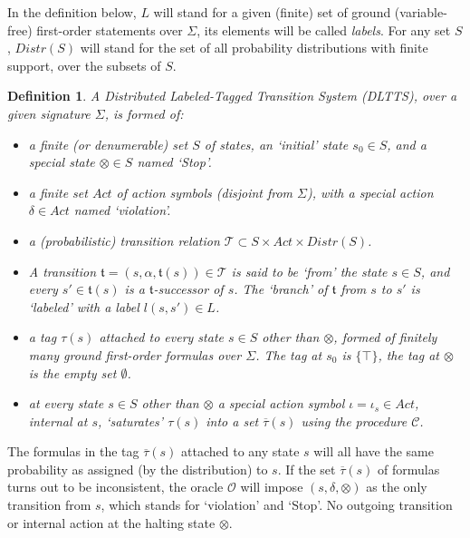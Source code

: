 \documentclass[pdflatex]{article}
\def \C {{\mathcal{C}}}
\def \o {{\mathcal{O}}}
\def \T {{\mathcal{T}}}
\def \t {{\mathfrak t}}
\newtheorem{defn}{Definition}
\def \otau {\overline{\tau}}
\begin{document}
In the definition below, $L$ will stand for a given (finite) set of ground (variable-free) 
first-order statements over $\Sigma$, its elements will be called {\em  labels}.
For any set $S$, $Distr(S)$ will stand for the set of all probability  distributions 
with finite support,  over the subsets of $S$. 

\begin{defn}
  A Distributed Labeled-Tagged Transition System (DLTTS), over a given
  signature $\Sigma$, is formed of:
  \begin{itemize}
 \item[-] a  finite (or denumerable) set $S$ of  states, an `initial'  state  $s_0 \in S$,
 and a special  state $\otimes \in S$ named `Stop'. 

\item[-] a finite set $Act$ of action symbols (disjoint from $\Sigma$), with  a
  special action $\delta \in Act$ named `violation'. 
    
\item[-] a (probabilistic) transition relation $\T \subset S\times Act \times Distr(S)$. 

  \item[-] A transition $\t = (s, \alpha, \t(s)) \in \T$ is said to be `from' the state
    $s \in S$,   and every  $s' \in  \t(s)$ is  a $\t$-successor of $s$. The `branch'  of
    $\t$ from $s$ to $s'$ is `labeled' with a label $l(s, s') \in L$. 
  
\item[-] a tag $\tau(s)$ attached to every state  $s \in S$ other than  $\otimes$, 
  formed of  finitely many ground  first-order formulas   over $\Sigma$.
  The tag at  $s_0$  is $\{\top\}$, the tag   at $\otimes$ is the empty set $\emptyset$. 

\item[-] at every state  $s \in S$ other than  $\otimes$  a special action symbol
  $\iota = \iota_s \in  Act$,  {\em internal}  at $s$,  `saturates' $\tau(s)$ into
  a set  $\otau(s)$  using the procedure $\C$. 
 \end{itemize}
\end{defn}

\vspace*{-0.5em}
The formulas in the tag $\otau(s)$ attached to any  state $s$  will all have 
the same probability as assigned (by the distribution) to  $s$. 
 If the set $\otau(s)$ of formulas turns out to be inconsistent,   the oracle
 $\o$ will impose $(s, \delta, \otimes)$ as the only  transition from $s$,
 which stands for `violation'  and `Stop'. No outgoing transition or internal
 action  at  the halting state $\otimes$. 
 
\end{document}
